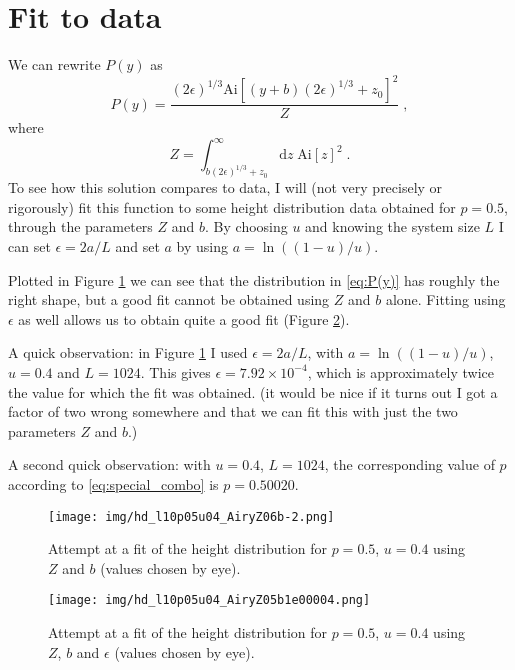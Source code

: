 \documentclass[a4paper,10pt]{article}
\newcommand{\fref}[1]{Figure \ref{#1}}
\newcommand{\Ai}{\mathrm{Ai}}
\begin{document}
\section{Fit to data}

We can rewrite $P(y)$ as
\begin{equation}\label{eq:P(y)}
 P(y) = \frac{(2\epsilon)^{1/3}\Ai[ (y + b)(2\epsilon)^{1/3} + z_0] ^2}{Z} \;, 
\end{equation}
where
\begin{equation}
 Z = \int_{b(2\epsilon)^{1/3} + z_0}^\infty \mathrm{d}z \; \Ai[z] ^2 \;.
\end{equation}
To see how this solution compares to data, I will (not very precisely or rigorously) fit this function to some height distribution data obtained for $p=0.5$, through the parameters $Z$ and $b$. By choosing $u$ and knowing the system size $L$ I can set $\epsilon = 2a/L$ and set $a$ by using $a = \ln( (1-u)/u)$.

Plotted in \fref{fig:Airy_2fit} we can see that the distribution in \eqref{eq:P(y)} has roughly the right shape, but a good fit cannot be obtained using $Z$ and $b$ alone. Fitting using $\epsilon$ as well allows us to obtain quite a good fit (\fref{fig:Airy_3fit}).

A quick observation: in \fref{fig:Airy_2fit} I used $\epsilon = 2a/L$, with $a = \ln((1-u)/u)$, $u=0.4$ and $L=1024$. This gives $\epsilon = 7.92\times10^{-4}$, which is approximately twice the value for which the fit was obtained. (it would be nice if it turns out I got a factor of two wrong somewhere and that we can fit this with just the two parameters $Z$ and $b$.)

A second quick observation: with $u=0.4$, $L = 1024$, the corresponding value of $p$ according to \eqref{eq:special_combo} is $p = 0.50020$.

\begin{figure}
 \centering
 \texttt{[image: img/hd\_l10p05u04\_AiryZ06b-2.png]}
 \caption{Attempt at a fit of the height distribution for $p=0.5$, $u = 0.4$ using $Z$ and $b$ (values chosen by eye).}
 \label{fig:Airy_2fit}
\end{figure}

\begin{figure}
 \centering
 \texttt{[image: img/hd\_l10p05u04\_AiryZ05b1e00004.png]}
 \caption{Attempt at a fit of the height distribution for $p=0.5$, $u=0.4$ using $Z$, $b$ and $\epsilon$ (values chosen by eye).}
 \label{fig:Airy_3fit}
\end{figure}
\end{document}
